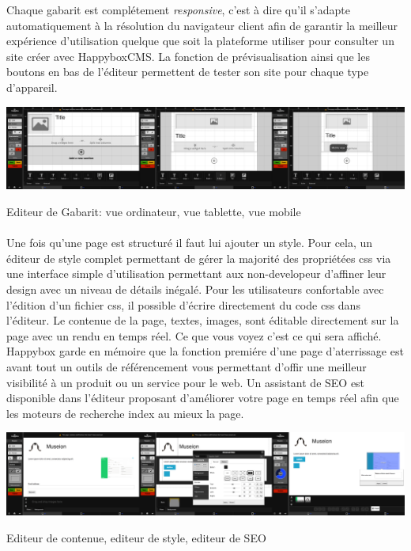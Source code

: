 \documentclass[11pt, a4paper ]{report}
\begin{document}
Chaque gabarit est complétement \emph{responsive}, c'est à dire qu'il s'adapte automatiquement à la résolution du navigateur client afin de garantir la meilleur expérience d'utilisation quelque que soit la plateforme utiliser pour consulter un site créer avec HappyboxCMS. La fonction de prévisualisation ainsi que les boutons en bas de l'éditeur permettent de tester son site pour chaque type d'appareil.


\begin{center}
	
		\includegraphics[width=\textwidth]{images/HBscreen/editeurGabarit.png}
		\caption{Editeur de Gabarit: vue ordinateur, vue tablette, vue mobile}
	
\end{center}

\paragraph{} %
Une fois qu'une page est structuré il faut lui ajouter un style. Pour cela, un éditeur de style complet permettant de gérer la majorité des propriétées css via une interface simple d'utilisation permettant aux non-developeur d'affiner leur design avec un niveau de détails inégalé. Pour les utilisateurs confortable avec l'édition d'un fichier css, il possible d'écrire directement du code css dans l'éditeur. 
Le contenue de la page, textes, images, sont éditable directement sur la page avec un rendu en temps réel. Ce que vous voyez c'est ce qui sera affiché.
Happybox garde en mémoire que la fonction premiére d'une page d'aterrissage est avant tout un outils de référencement vous permettant d'offir une meilleur visibilité à un produit ou un service pour le web. Un assistant de SEO est disponible dans l'éditeur proposant d'améliorer votre page en temps réel afin que les moteurs de recherche index au mieux la page.
\begin{center}
	\includegraphics[width=\textwidth]{images/HBscreen/contenueStyleSeo.png}
	\caption{Editeur de contenue, editeur de style, editeur de SEO}
\end{center}
\end{document}
